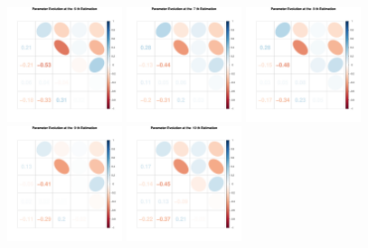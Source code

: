 \begin{figure}[h]
\includegraphics[width=0.3\textwidth,height=0.18\textheight]{Chapters/05MCMCOU/plots/paraEvolution/corMatrix6.pdf}
\includegraphics[width=0.3\textwidth,height=0.18\textheight]{Chapters/05MCMCOU/plots/paraEvolution/corMatrix7.pdf}
\includegraphics[width=0.3\textwidth,height=0.18\textheight]{Chapters/05MCMCOU/plots/paraEvolution/corMatrix8.pdf}
\includegraphics[width=0.3\textwidth,height=0.18\textheight]{Chapters/05MCMCOU/plots/paraEvolution/corMatrix9.pdf}
\includegraphics[width=0.3\textwidth,height=0.18\textheight]{Chapters/05MCMCOU/plots/paraEvolution/corMatrix10.pdf}

\end{figure}
